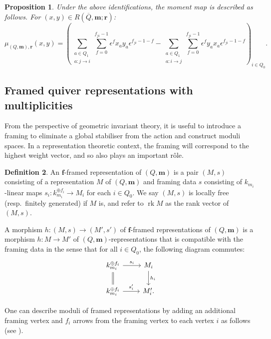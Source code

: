 \documentclass[a4paper,12pt]{article}
\theoremstyle{definition}
\newtheorem{definition}{Definition}[section]
\theoremstyle{plain}
\newtheorem{proposition}[definition]{Proposition}
\theoremstyle{remark}
\DeclareMathOperator{\rk}{rk}
\newcommand\bff{\mathbf{f}}
\newcommand\bfm{\mathbf{m}}
\newcommand\bfr{\mathbf{r}}
\begin{document}
\begin{proposition}
 Under the above identifications, the moment map is described as follows. For $(x,y)\in R(\overline{Q},\bfm;\bfr)$:
\[
\mu_{(Q,\bfm),\bfr}(x,y)=
\left(
\sum_{\substack{a\in Q_1 \\ a \colon j\rightarrow i}}
\sum_{f=0}^{f_{ji}-1}
\epsilon^{f}x_ay_a\epsilon^{f_{ji}-1-f}
-
\sum_{\substack{a\in Q_1 \\ a \colon i\rightarrow j}}
\sum_{f=0}^{f_{ji}-1}
\epsilon^{f}y_ax_a\epsilon^{f_{ji}-1-f}
\right)_{i\in Q_0}
.
\]
\end{proposition}

\subsection{Framed quiver representations with multiplicities}\label{Sect/framedQuivRep}

From the perspective of geometric invariant theory, it is useful to introduce a framing to eliminate a global stabiliser from the action and construct moduli spaces. In a representation theoretic context, the framing will correspond to the highest weight vector, and so also plays an important r\^{o}le.

\begin{definition}
An $\bff$-framed representation of $(Q,\bfm)$ is a pair $(M,s)$ consisting of a representation $M$ of $(Q,\bfm)$ and framing data $s$ consisting of $k_{m_i}$-linear maps $s_{i}\colon k_{m_i}^{\oplus f_i}\rightarrow M_i$ for each $i \in Q_0$. We say $(M,s)$ is locally free (resp.\ finitely generated) if $M$ is, and refer to $\rk M$ as the rank vector of $(M,s)$.

A morphism $h \colon (M,s)\rightarrow (M',s')$ of $\bff$-framed representations of $(Q,\bfm)$ is a morphism $h \colon M \rightarrow M'$ of $(Q,\bfm)$-representations that is compatible with the framing data in the sense that for all $i\in Q_0$, the following diagram commutes:
\[
\begin{tikzcd}
k_{m_i}^{\oplus f_i} \ar[r,"s_i"]\ar[d,equal] & M_{i} \ar[d,"h_i"] \\
k_{m_i}^{\oplus f_i} \ar[r,"s_i'"] & M'_{i}.
\end{tikzcd}
\]
\end{definition}

One can describe moduli of framed representations by adding an additional framing vertex and $f_i$ arrows from the framing vertex to each vertex $i$ as follows (see \cite{CB01}\cite[\S 2.3.2]{HJV25}).
\end{document}
